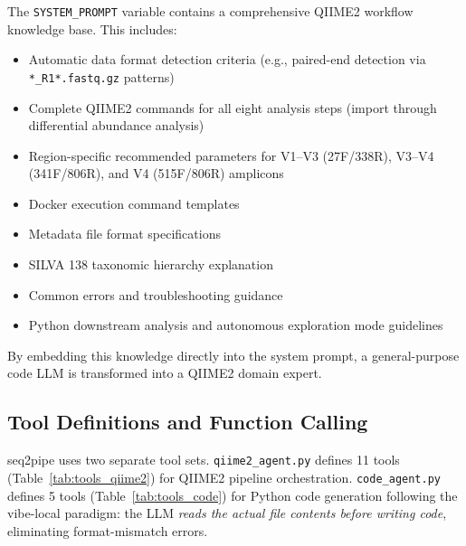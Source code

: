 \documentclass[12pt, a4paper]{article}
\begin{document}
The \texttt{SYSTEM\_PROMPT} variable contains a comprehensive QIIME2
workflow knowledge base. This includes:

\begin{itemize}
  \item Automatic data format detection criteria
    (e.g., paired-end detection via \texttt{*\_R1*.fastq.gz} patterns)
  \item Complete QIIME2 commands for all eight analysis steps
    (import through differential abundance analysis)
  \item Region-specific recommended parameters for
    V1--V3 (27F/338R), V3--V4 (341F/806R), and V4 (515F/806R) amplicons
  \item Docker execution command templates
  \item Metadata file format specifications
  \item SILVA 138 taxonomic hierarchy explanation
  \item Common errors and troubleshooting guidance
  \item Python downstream analysis and autonomous exploration mode guidelines
\end{itemize}

By embedding this knowledge directly into the system prompt,
a general-purpose code LLM is transformed into a QIIME2 domain expert.

\subsection{Tool Definitions and Function Calling}

seq2pipe uses two separate tool sets.
\texttt{qiime2\_agent.py} defines 11 tools (Table~\ref{tab:tools_qiime2})
for QIIME2 pipeline orchestration.
\texttt{code\_agent.py} defines 5 tools (Table~\ref{tab:tools_code})
for Python code generation following the vibe-local paradigm:
the LLM \emph{reads the actual file contents before writing code},
eliminating format-mismatch errors.
\end{document}
